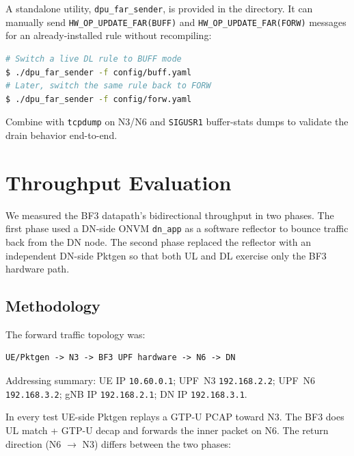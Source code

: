 \documentclass[conference]{IEEEtran}
\newcommand{\code}[1]{\nolinkurl{#1}}
\begin{document}
A standalone utility, \code{dpu_far_sender}, is provided in the
 directory.  It can manually send
\code{HW_OP_UPDATE_FAR(BUFF)} and \code{HW_OP_UPDATE_FAR(FORW)}
messages for an already-installed rule without recompiling:

\begin{lstlisting}[language=bash]
# Switch a live DL rule to BUFF mode
$ ./dpu_far_sender -f config/buff.yaml
# Later, switch the same rule back to FORW
$ ./dpu_far_sender -f config/forw.yaml
\end{lstlisting}

Combine with \code{tcpdump} on N3/N6 and \code{SIGUSR1} buffer-stats
dumps to validate the drain behavior end-to-end.

\section{Throughput Evaluation}
\label{sec:throughput}

We measured the BF3 datapath's bidirectional throughput in two
phases.  The first phase used a DN-side ONVM \code{dn_app} as a
software reflector to bounce traffic back from the DN node.  The
second phase replaced the reflector with an independent DN-side
Pktgen so that both UL and DL exercise only the BF3 hardware path.

\subsection{Methodology}

The forward traffic topology was:

\begin{lstlisting}
UE/Pktgen -> N3 -> BF3 UPF hardware -> N6 -> DN
\end{lstlisting}

Addressing summary: UE IP \code{10.60.0.1}; UPF~N3
\code{192.168.2.2}; UPF~N6 \code{192.168.3.2}; gNB IP
\code{192.168.2.1}; DN IP \code{192.168.3.1}.

In every test UE-side Pktgen replays a GTP-U PCAP toward N3.  The BF3
does UL match + GTP-U decap and forwards the inner packet on N6.  The
return direction (N6 $\to$ N3) differs between the two phases:
\end{document}
